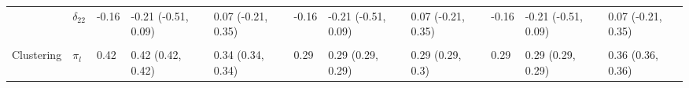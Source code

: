 \documentclass[]{article}
\begin{document}
\begin{landscape}
\begin{table}[t]
\begin{tabular}{lllllllllll}
\hspace{1em} & $\delta_{22}$ & -0.16 & -0.21 (-0.51, 0.09) & 0.07 (-0.21, 0.35) & -0.16 & -0.21 (-0.51, 0.09) & 0.07 (-0.21, 0.35) & -0.16 & -0.21 (-0.51, 0.09) & 0.07 (-0.21, 0.35)\\
\addlinespace[0.3em]
\multicolumn{11}{l}{\textbf{ }}\\
\hspace{1em}Clustering & $\pi_l$ & 0.42 & 0.42 (0.42, 0.42) & 0.34 (0.34, 0.34) & 0.29 & 0.29 (0.29, 0.29) & 0.29 (0.29, 0.3) & 0.29 & 0.29 (0.29, 0.29) & 0.36 (0.36, 0.36)\\
\bottomrule
\end{tabular}
\end{table}
\end{landscape}
\end{document}
